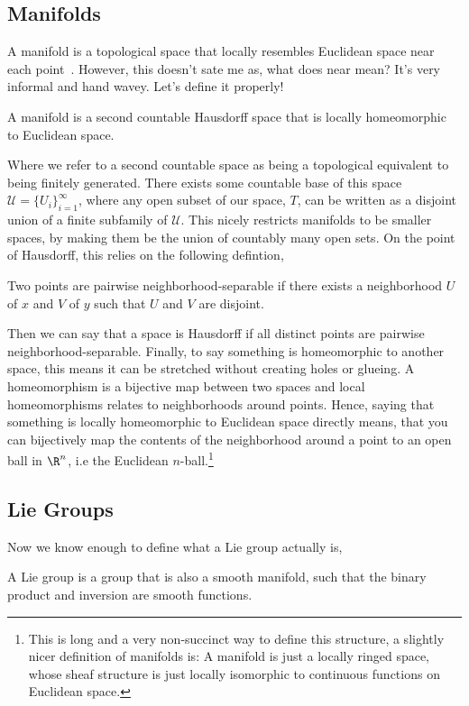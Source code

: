 \subsection{Manifolds}
A manifold is a topological space that locally resembles Euclidean space near each point~\cite{wmwMan}. However, this doesn't sate me as, what does near mean? It's very informal and hand wavey. Let's define it properly!
\begin{ndefi}[Manifold]
  A manifold is a second countable Hausdorff space that is locally homeomorphic to Euclidean space.
\end{ndefi}
Where we refer to a second countable space as being a topological equivalent to being finitely generated. There exists some countable base of this space $\mathcal{U} = \{U_i\}_{i=1}^\infty$, where any open subset of our space, $T$, can be written as a disjoint union of a finite subfamily of $\mathcal{U}$. This nicely restricts manifolds to be smaller spaces, by making them be the union of countably many open sets. On the point of Hausdorff, this relies on the following defintion,
\begin{ndefi}
  Two points are pairwise neighborhood-separable if there exists a neighborhood $U$ of $x$ and $V$ of $y$ such that $U$ and $V$ are disjoint.
\end{ndefi}
Then we can say that a space is Hausdorff if all distinct points are pairwise neighborhood-separable. Finally, to say something is homeomorphic to another space, this means it can be stretched without creating holes or glueing. A homeomorphism is a bijective map between two spaces and local homeomorphisms relates to neighborhoods around points. Hence, saying that something is locally homeomorphic to Euclidean space directly means, that you can bijectively map the contents of the neighborhood around a point to an open ball in $\R^n$, i.e the Euclidean $n$-ball.\footnote{This is long and a very non-succinct way to define this structure, a slightly nicer definition of manifolds is: A manifold is just a locally ringed space, whose sheaf structure is just locally isomorphic to continuous functions on Euclidean space.}

\noindent
\subsection{Lie Groups}
Now we know enough to define what a Lie group actually is,
\begin{ndefi}
  A Lie group is a group that is also a smooth manifold, such that the binary product and inversion are smooth functions.
\end{ndefi}


